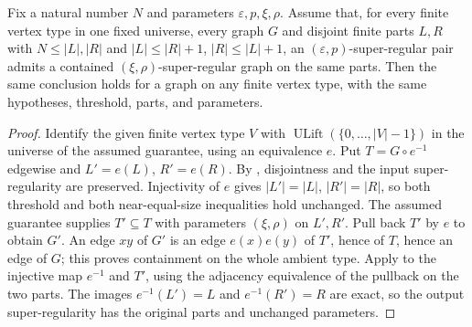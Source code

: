 \begin{lemma}
Fix a natural number $N$ and parameters $\varepsilon,p,\xi,\rho$.
Assume that, for every finite vertex type in one fixed universe, every graph
$G$ and disjoint finite parts $L,R$ with $N\le |L|,|R|$ and
$|L|\le |R|+1$, $|R|\le |L|+1$, an
$(\varepsilon,p)$-super-regular pair admits a contained
$(\xi,\rho)$-super-regular graph on the same parts.
Then the same conclusion holds for a graph on any finite vertex type,
with the same hypotheses, threshold, parts, and parameters.
\end{lemma}
\begin{proof}
Identify the given finite vertex type $V$ with
$\operatorname{ULift}(\{0,\ldots,|V|-1\})$ in the universe of the
assumed guarantee, using an equivalence $e$. Put $T=G\circ e^{-1}$
edgewise and $L'=e(L)$, $R'=e(R)$. By
, disjointness and the input
super-regularity are preserved. Injectivity of $e$ gives
$|L'|=|L|$, $|R'|=|R|$, so both threshold and both near-equal-size
inequalities hold unchanged. The assumed guarantee supplies $T'\subseteq T$
with parameters $(\xi,\rho)$ on $L',R'$.
Pull back $T'$ by $e$ to obtain $G'$. An edge $xy$ of $G'$ is an edge
$e(x)e(y)$ of $T'$, hence of $T$, hence an edge of $G$; this proves
containment on the whole ambient type. Apply
 to the injective map $e^{-1}$ and $T'$,
using the adjacency equivalence of the pullback on the two parts. The images
$e^{-1}(L')=L$ and $e^{-1}(R')=R$ are exact, so the output
super-regularity has the original parts and unchanged parameters.
\end{proof}
